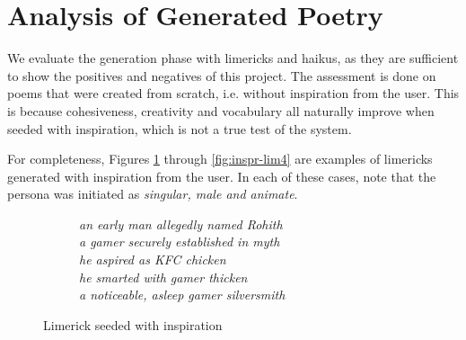 \section{Analysis of Generated Poetry}

We evaluate the generation phase with limericks and haikus, as they are sufficient to show the positives and negatives of this project. The assessment is done on poems that were created from scratch, i.e. without inspiration from the user. This is because cohesiveness, creativity and vocabulary all naturally improve when seeded with inspiration, which is not a true test of the system.

For completeness, Figures \ref{fig:inspr-lim1} through \ref{fig:inspr-lim4} are examples of limericks generated with inspiration from the user. In each of these cases, note that the persona was initiated as \textit{singular, male and animate}.

\begin{figure}[H]
\centering
\begin{subfigure}[t!]{0.4\textwidth}
	\centering
\end{subfigure}
\begin{subfigure}[t!]{0.5\textwidth}
	\centering
    \textit{an early man allegedly named Rohith\\a gamer securely established in myth\\he aspired as KFC chicken\\he smarted with gamer thicken\\a noticeable, asleep gamer silversmith}
\end{subfigure}
\caption{Limerick seeded with inspiration}
\label{fig:inspr-lim1}
\end{figure}


